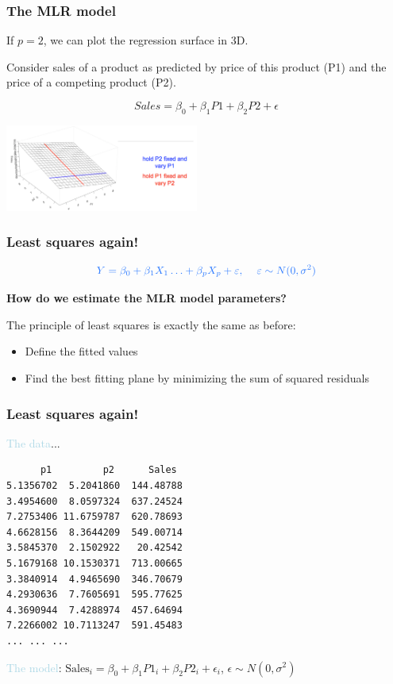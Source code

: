 \documentclass{beamer}
\newcommand{\bo}[1]{\textcolor{burntorange}{#1}}
\newcommand{\lb}[1]{\textcolor{lightblue}{#1}}
\newcommand{\bl}{\color{lightblue}}
\newcommand{\rd}{\color{burntorange}}
\newcommand{\bk}{\color{black}}
\newcommand{\bi}{\begin{itemize}}
\newcommand{\ib}{\end{itemize}}
\newcommand{\p}{\item}
\newcommand{\sk}{\vspace{.5cm}}
\begin{document}

\begin{frame}
\frametitle{The MLR model}

\sk
If $p=2$, we can plot the regression surface in 3D. \\ \sk

Consider  sales of a product as predicted by price of this 
product ({\bl P1}) and the price of a competing product ({\rd P2}). 


$$
Sales = \beta_0 + \beta_1 P1 + \beta_2 P2 + \epsilon
$$
\vspace{-0.7cm}
\begin{center}
\includegraphics[width=2.5in]{figures/plane}
\end{center}
\end{frame}

\begin{frame}
\frametitle{Least squares again!}  

\[\bl \large Y  = \beta_0 + \beta_1 X_1 \ldots
+ \beta_p X_p + \varepsilon,\quad \varepsilon \sim N(0, \sigma^2) \]

\sk
{\bf How do we estimate the MLR model parameters?}

\sk
The principle of \bo{least squares} is exactly the same as before: \sk
\bi
\p Define the fitted values 
\p Find the best fitting plane by minimizing the sum of squared 
residuals
\ib

\end{frame}

\begin{frame}[containsverbatim]
\frametitle{Least squares again!}

\lb{The data}...
\begin{verbatim}
      p1         p2      Sales  
5.1356702  5.2041860  144.48788 
3.4954600  8.0597324  637.24524 
7.2753406 11.6759787  620.78693 
4.6628156  8.3644209  549.00714 
3.5845370  2.1502922   20.42542 
5.1679168 10.1530371  713.00665 
3.3840914  4.9465690  346.70679 
4.2930636  7.7605691  595.77625 
4.3690944  7.4288974  457.64694 
7.2266002 10.7113247  591.45483 
... ... ... 
\end{verbatim}

\lb{The model}: \bk $\text{Sales}_i = \beta_0 + \beta_1P1_i + \beta_2 P2_i + \epsilon_i$, $\epsilon\sim N(0,\sigma^2)$


\end{frame}
\end{document}
